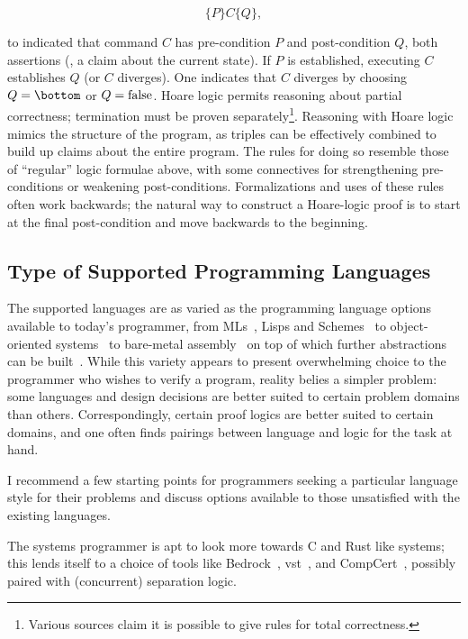 \begin{equation*}
    \{P\}C\{Q\},
\end{equation*}

to indicated that command \(C\) has pre-condition \(P\) and post-condition
\(Q\), both assertions (\eg, a claim about the current state). If \(P\) is
established, executing \(C\) establishes \(Q\) (or \(C\) diverges). One
indicates that \(C\) diverges by choosing \(Q = \bottom\) or \(Q = \operatorname{false}\).
Hoare logic permits reasoning about partial correctness; termination must be
proven separately\footnote{Various sources claim it is possible to give rules
for total correctness.}. Reasoning with Hoare logic mimics the structure of the
program, as triples can be effectively combined to build up claims about the
entire program. The rules for doing so resemble those of ``regular'' logic
formulae above, with some connectives for strengthening pre-conditions or
weakening post-conditions. Formalizations and uses of these rules often work
backwards; the natural way to construct a Hoare-logic proof is to start at the
final post-condition and move backwards to the beginning.


\subsection{Type of Supported Programming Languages}\label{S:t_pl}

The supported languages are as varied as the programming language options
available to today's programmer, from MLs~\cite{Coq}, Lisps and
Schemes~\cite{Torlak_2013} to object-oriented
systems~\cite{leino2008specification,leino2010dafny} to bare-metal
assembly~\cite{Chlipala_2011} on top of which further abstractions can be
built~\cite{Chlipala_2015}. While this variety appears to present overwhelming
choice to the programmer who wishes to verify a program, reality belies a
simpler problem: some languages and design decisions are better suited to
certain problem domains than others. Correspondingly, certain proof logics are
better suited to certain domains, and one often finds pairings between language
and logic for the task at hand.

I recommend a few starting points for programmers seeking a particular language
style for their problems and discuss options available to those unsatisfied with
the existing languages.

The systems programmer is apt to look more towards C and Rust like systems; this
lends itself to a choice of tools like Bedrock~\cite{Chlipala_2011},
\gls{vst}~\cite{VST}, and CompCert~\cite{Kastner-LBSSF-2017}, possibly paired
with (concurrent) separation logic.


